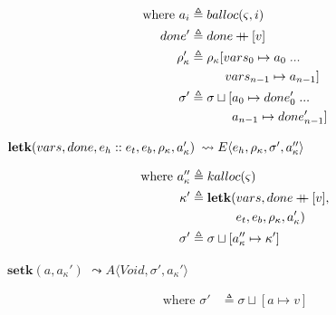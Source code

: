 \documentclass[12pt,draft]{article}
\newcommand\mdoubleplus{\ensuremath{\mathbin{+\mkern-9mu+}}}
\newcommand{\store}[0]{\sigma}
\newcommand{\baddr}[0]{a}
\newcommand{\kaddr}[0]{a_{\kappa}}
\newcommand{\kont}[0]{\kappa}
\newcommand{\state}[0]{\varsigma}
\newcommand{\E}[4]{E\langle #1 , #2 , #3 , #4 \rangle}
\newcommand{\A}[3]{A\langle #1 , #2 , #3 \rangle}
\begin{document}
\begin{multicols*}{2}
\begin{align*}
  \text{where }
  \baddr_i &\triangleq balloc(\state , i) \\
  done' &\triangleq done \mdoubleplus [v] \\
  \kenv' &\triangleq \kenv[vars_0 \mapsto a_0\;...\\
           &\;\;\;\;\;\;\;\;\;\; vars_{n-1} \mapsto a_{n-1}] \\
  \store' &\triangleq \sigma \sqcup [a_0 \mapsto done'_0\;...\\
           &\;\;\;\;\;\;\;\;\;\;\;\; a_{n-1} \mapsto done'_{n-1}]
\end{align*}
\begin{center}
  $\textbf{letk}(vars, done, e_h::e_t , e_b , \kenv , \kaddr')$
  $\leadsto \E{e_h}{\kenv}{\store'}{\kaddr''}$
\end{center}
\vspace{-7mm}
\begin{align*}
  \text{where }
  \kaddr'' &\triangleq kalloc(\state) \\
  \kont' &\triangleq \textbf{letk}(vars, done \mdoubleplus [v], \\
           &\;\;\;\;\;\;\;\;\;\;\;\;\;e_t , e_b , \kenv , \kaddr') \\
  \store' &\triangleq \store \sqcup [\kaddr'' \mapsto \kont']
\end{align*}
\begin{center}
  $\textbf{setk}(\baddr, \kaddr')$
  $\leadsto \A{\textit{Void}}{\store'}{\kaddr'}$
\end{center}
\vspace{-7mm}
\begin{align*}
  \text{where } \store' &\triangleq \store \sqcup [a \mapsto v]
\end{align*}

\vfill\null
\columnbreak



\end{multicols*}
\end{document}
